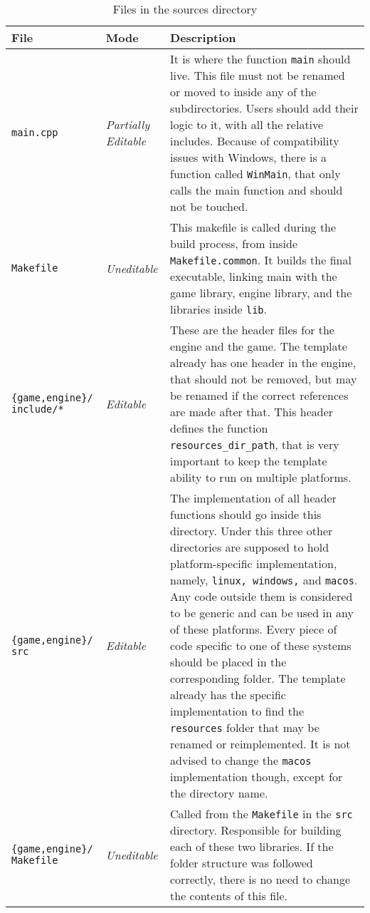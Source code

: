 \begin{longtable}{p{3cm}p{2cm}p{10cm}}

\caption{Files in the sources directory}\label{tab:files_src_dir}\\
\toprule
\textbf{File} & \textbf{Mode} & \textbf{Description} \\
\midrule
\endhead

\texttt{main.cpp} & \textit{Partially Editable} & It is where the function \texttt{main} should live. This file must not be renamed or moved to inside any of the subdirectories. Users should add their logic to it, with all the relative includes. Because of compatibility issues with Windows, there is a function called \texttt{WinMain}, that only calls the main function and should not be touched. \\ \hline
\texttt{Makefile} & \textit{Uneditable} & This makefile is called during the build process, from inside \texttt{Makefile.common}. It builds the final executable, linking main with the game library, engine library, and the libraries inside \texttt{lib}. \\ \hline
\texttt{\{game,engine\}/ include/*} & \textit{Editable} & These are the header files for the engine and the game. The template already has one header in the engine, that should not be removed, but may be renamed if the correct references are made after that. This header defines the function \texttt{resources\_dir\_path}, that is very important to keep the template ability to run on multiple platforms. \\ \hline
\texttt{\{game,engine\}/ src} & \textit{Editable} & The implementation of all header functions should go inside this directory. Under this three other directories are supposed to hold platform-specific implementation, namely, \texttt{linux, windows,} and \texttt{macos}. Any code outside them is considered to be generic and can be used in any of these platforms. Every piece of code specific to one of these systems should be placed in the corresponding folder. The template already has the specific implementation to find the \texttt{resources} folder that may be renamed or reimplemented. It is not advised to change the \texttt{macos} implementation though, except for the directory name. \\ \hline
\texttt{\{game,engine\}/ Makefile} & \textit{Uneditable} & Called from the \texttt{Makefile} in the \texttt{src} directory. Responsible for building each of these two libraries. If the folder structure was followed correctly, there is no need to change the contents of this file. \\

\bottomrule
\end{longtable}




